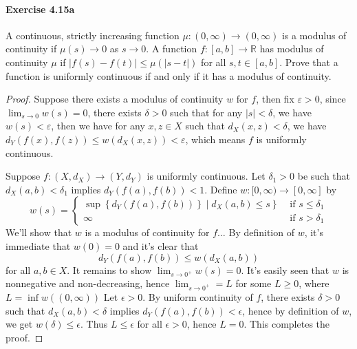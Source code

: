 \documentclass{article}
\begin{document}
\paragraph{Exercise 4.15a} A continuous, strictly increasing function $\mu \colon (0, \infty) \rightarrow (0, \infty)$ is a modulus of continuity if $\mu(s) \rightarrow 0$ as $s \rightarrow 0$. A function $f \colon [a, b] \rightarrow \mathbb{R}$ has modulus of continuity $\mu$ if $|f(s) - f(t)| \leq \mu(|s - t|)$ for all $s, t \in [a, b]$. Prove that a function is uniformly continuous if and only if it has a modulus of continuity.
\begin{proof}
    Suppose there exists a modulus of continuity $w$ for $f$, then fix $\varepsilon>0$, since $\lim _{s \rightarrow 0} w(s)=0$, there exists $\delta>0$ such that for any $|s|<\delta$, we have $w(s)<\varepsilon$, then we have for any $x, z \in X$ such that $d_X(x, z)<\delta$, we have $d_Y(f(x), f(z)) \leq w\left(d_X(x, z)\right)<\varepsilon$, which means $f$ is uniformly continuous.

Suppose $f:\left(X, d_X\right) \rightarrow\left(Y, d_Y\right)$ is uniformly continuous.
Let $\delta_1>0$ be such that $d_X(a, b)<\delta_1$ implies $d_Y(f(a), f(b))<1$.
Define $w:[0, \infty) \rightarrow[0, \infty]$ by
$$
w(s)= \begin{cases}\left.\sup \left\{d_Y(f(a), f(b))\right\} \mid d_X(a, b) \leq s\right\} & \text { if } s \leq \delta_1 \\ \infty & \text { if } s>\delta_1\end{cases}
$$
We'll show that $w$ is a modulus of continuity for $f \ldots$
By definition of $w$, it's immediate that $w(0)=0$ and it's clear that
$$
d_Y(f(a), f(b)) \leq w\left(d_X(a, b)\right)
$$
for all $a, b \in X$.
It remains to show $\lim _{s \rightarrow 0^{+}} w(s)=0$.
It's easily seen that $w$ is nonnegative and non-decreasing, hence $\lim _{s \rightarrow 0^{+}}=L$ for some $L \geq 0$, where $L=\inf w((0, \infty))$
Let $\epsilon>0$.
By uniform continuity of $f$, there exists $\delta>0$ such that $d_X(a, b)<\delta$ implies $d_Y(f(a), f(b))<\epsilon$, hence by definition of $w$, we get $w(\delta) \leq \epsilon$.
Thus $L \leq \epsilon$ for all $\epsilon>0$, hence $L=0$.
This completes the proof.
\end{proof}
\end{document}
